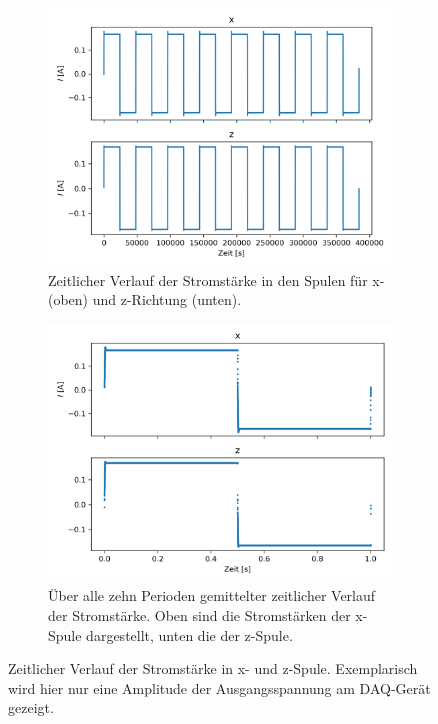 \documentclass[page,pdftex,12pt,a4paper,twoside,openright]{scrbook}
\begin{document}
\begin{figure}[H]
\centering
\begin{subfigure}[t]{.5\textwidth}
\includegraphics[width=\textwidth]{./img/strom.png}
\caption{Zeitlicher Verlauf der Stromstärke in den Spulen für x- (oben) und z-Richtung (unten).}
\label{fig-stromraw}
\end{subfigure}%
\begin{subfigure}[t]{.5\textwidth}
\includegraphics[width=\textwidth]{./img/strom_avg.png}
\caption{Über alle zehn Perioden gemittelter zeitlicher Verlauf der Stromstärke. Oben sind die Stromstärken der x-Spule dargestellt, unten die der z-Spule.}
\label{fig-strom_avg}
\end{subfigure}
\caption{Zeitlicher Verlauf der Stromstärke in x- und z-Spule. Exemplarisch wird hier nur eine Amplitude der Ausgangsspannung am DAQ-Gerät gezeigt.}
\end{figure}
\end{document}
